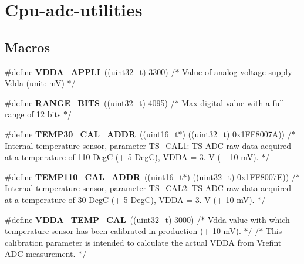 \hypertarget{group__cpu-adc-utilities}{\section{Cpu-\/adc-\/utilities}
\label{group__cpu-adc-utilities}
}
\subsection*{Macros}
\begin{DoxyCompactItemize}
\item 
\hypertarget{group__cpu-adc-utilities_ga773a2f94399984a865880e64f40a6172}{\#define {\bfseries V\-D\-D\-A\-\_\-\-A\-P\-P\-L\-I}~((uint32\-\_\-t) 3300)    /$\ast$ Value of analog voltage supply Vdda (unit\-: m\-V) $\ast$/}\label{group__cpu-adc-utilities_ga773a2f94399984a865880e64f40a6172}

\item 
\hypertarget{group__cpu-adc-utilities_gaad9d5bc8be540a4a3b51556d2c989986}{\#define {\bfseries R\-A\-N\-G\-E\-\_\-B\-I\-T\-S}~((uint32\-\_\-t) 4095)    /$\ast$ Max digital value with a full range of 12 bits $\ast$/}\label{group__cpu-adc-utilities_gaad9d5bc8be540a4a3b51556d2c989986}

\item 
\hypertarget{group__cpu-adc-utilities_gac6ec4e75c2713b03028da7e4fae538bb}{\#define {\bfseries T\-E\-M\-P30\-\_\-\-C\-A\-L\-\_\-\-A\-D\-D\-R}~((uint16\-\_\-t$\ast$) ((uint32\-\_\-t) 0x1\-F\-F8007\-A)) /$\ast$ Internal temperature sensor, parameter T\-S\-\_\-\-C\-A\-L1\-: T\-S A\-D\-C raw data acquired at a temperature of 110 Deg\-C (+-\/5 Deg\-C), V\-D\-D\-A = 3. V (+-\/10 m\-V). $\ast$/}\label{group__cpu-adc-utilities_gac6ec4e75c2713b03028da7e4fae538bb}

\item 
\hypertarget{group__cpu-adc-utilities_ga12cff7d68ffa596315a731d300ad77b9}{\#define {\bfseries T\-E\-M\-P110\-\_\-\-C\-A\-L\-\_\-\-A\-D\-D\-R}~((uint16\-\_\-t$\ast$) ((uint32\-\_\-t) 0x1\-F\-F8007\-E)) /$\ast$ Internal temperature sensor, parameter T\-S\-\_\-\-C\-A\-L2\-: T\-S A\-D\-C raw data acquired at a temperature of  30 Deg\-C (+-\/5 Deg\-C), V\-D\-D\-A = 3. V (+-\/10 m\-V). $\ast$/}\label{group__cpu-adc-utilities_ga12cff7d68ffa596315a731d300ad77b9}

\item 
\hypertarget{group__cpu-adc-utilities_ga77d1256333815f31d608d31528b7dddd}{\#define {\bfseries V\-D\-D\-A\-\_\-\-T\-E\-M\-P\-\_\-\-C\-A\-L}~((uint32\-\_\-t) 3000)        /$\ast$ Vdda value with which temperature sensor has been calibrated in production (+-\/10 m\-V). $\ast$/                                                               /$\ast$ This calibration parameter is intended to calculate the actual V\-D\-D\-A from Vrefint A\-D\-C measurement. $\ast$/}\label{group__cpu-adc-utilities_ga77d1256333815f31d608d31528b7dddd}


\end{DoxyCompactItemize}
